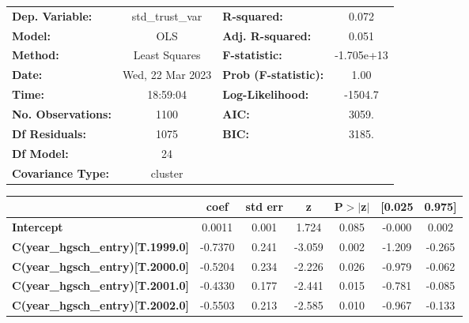 \begin{center}
\begin{tabular}{lclc}
\toprule
\textbf{Dep. Variable:}                  & std\_trust\_var  & \textbf{  R-squared:         } &     0.072   \\
\textbf{Model:}                          &       OLS        & \textbf{  Adj. R-squared:    } &     0.051   \\
\textbf{Method:}                         &  Least Squares   & \textbf{  F-statistic:       } & -1.705e+13  \\
\textbf{Date:}                           & Wed, 22 Mar 2023 & \textbf{  Prob (F-statistic):} &     1.00    \\
\textbf{Time:}                           &     18:59:04     & \textbf{  Log-Likelihood:    } &   -1504.7   \\
\textbf{No. Observations:}               &        1100      & \textbf{  AIC:               } &     3059.   \\
\textbf{Df Residuals:}                   &        1075      & \textbf{  BIC:               } &     3185.   \\
\textbf{Df Model:}                       &          24      & \textbf{                     } &             \\
\textbf{Covariance Type:}                &     cluster      & \textbf{                     } &             \\
\bottomrule
\end{tabular}
\begin{tabular}{lcccccc}
                                         & \textbf{coef} & \textbf{std err} & \textbf{z} & \textbf{P$> |$z$|$} & \textbf{[0.025} & \textbf{0.975]}  \\
\midrule
\textbf{Intercept}                       &       0.0011  &        0.001     &     1.724  &         0.085        &       -0.000    &        0.002     \\
\textbf{C(year\_hgsch\_entry)[T.1999.0]} &      -0.7370  &        0.241     &    -3.059  &         0.002        &       -1.209    &       -0.265     \\
\textbf{C(year\_hgsch\_entry)[T.2000.0]} &      -0.5204  &        0.234     &    -2.226  &         0.026        &       -0.979    &       -0.062     \\
\textbf{C(year\_hgsch\_entry)[T.2001.0]} &      -0.4330  &        0.177     &    -2.441  &         0.015        &       -0.781    &       -0.085     \\
\textbf{C(year\_hgsch\_entry)[T.2002.0]} &      -0.5503  &        0.213     &    -2.585  &         0.010        &       -0.967    &       -0.133     \\

\end{tabular}
\end{center}
